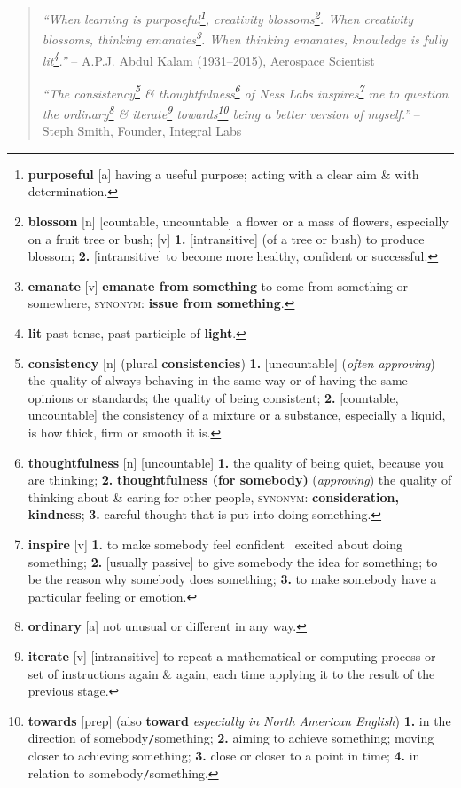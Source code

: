 \documentclass[oneside]{book}
\numberwithin{equation}{section}
\begin{document}
\begin{quotation}
	\textit{``When learning is purposeful\footnote{\textbf{purposeful} [a] having a useful purpose; acting with a clear aim \& with determination.}, creativity blossoms\footnote{\textbf{blossom} [n] [countable, uncountable] a flower or a mass of flowers, especially on a fruit tree or bush; [v] \textbf{1.} [intransitive] (of a tree or bush) to produce blossom; \textbf{2.} [intransitive] to become more healthy, confident or successful.}. When creativity blossoms, thinking emanates\footnote{\textbf{emanate} [v] \textbf{emanate from something} to come from something or somewhere, \textsc{synonym}: \textbf{issue from something}.}. When thinking emanates, knowledge is fully lit\footnote{\textbf{lit} past tense, past participle of \textbf{light}.}.''} -- A.P.J. Abdul Kalam (1931--2015), Aerospace Scientist
	
	\textit{``The consistency\footnote{\textbf{consistency} [n] (plural \textbf{consistencies}) \textbf{1.} [uncountable] (\textit{often approving}) the quality of always behaving in the same way or of having the same opinions or standards; the quality of being consistent; \textbf{2.} [countable, uncountable] the consistency of a mixture or a substance, especially a liquid, is how thick, firm or smooth it is.} \& thoughtfulness\footnote{\textbf{thoughtfulness} [n] [uncountable] \textbf{1.} the quality of being quiet, because you are thinking; \textbf{2.} \textbf{thoughtfulness (for somebody)} (\textit{approving}) the quality of thinking about \& caring for other people, \textsc{synonym}: \textbf{consideration, kindness}; \textbf{3.} careful thought that is put into doing something.} of Ness Labs inspires\footnote{\textbf{inspire} [v] \textbf{1.} to make somebody feel confident \ excited about doing something; \textbf{2.} [usually passive] to give somebody the idea for something; to be the reason why somebody does something; \textbf{3.} to make somebody have a particular feeling or emotion.} me to question the ordinary\footnote{\textbf{ordinary} [a] not unusual or different in any way.} \& iterate\footnote{\textbf{iterate} [v] [intransitive] to repeat a mathematical or computing process or set of instructions again \& again, each time applying it to the result of the previous stage.} towards\footnote{\textbf{towards} [prep] (also \textbf{toward} \textit{especially in North American English}) \textbf{1.} in the direction of somebody\texttt{/}something; \textbf{2.} aiming to achieve something; moving closer to achieving something; \textbf{3.} close or closer to a point in time; \textbf{4.} in relation to somebody\texttt{/}something.} being a better version of myself.''} -- Steph Smith, Founder, Integral Labs
	

\end{quotation}
\end{document}
